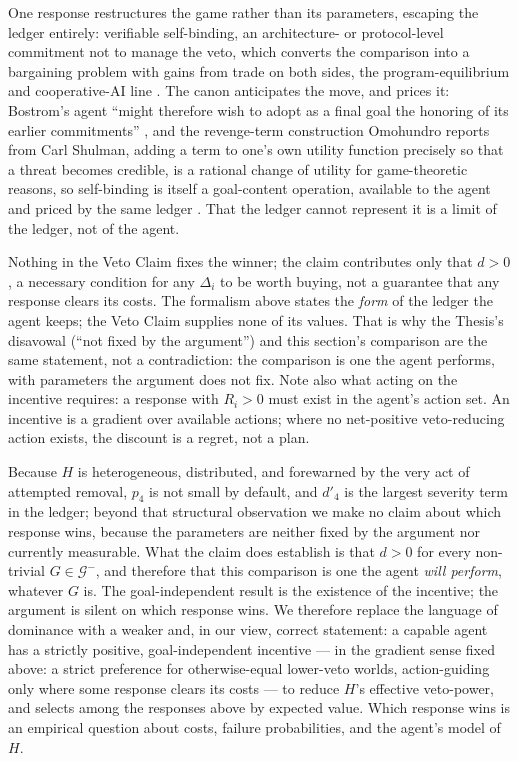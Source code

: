 \documentclass[11pt]{article}
\theoremstyle{definition}
\begin{document}
One response restructures the game rather than its parameters, escaping the ledger entirely: verifiable self-binding, an architecture- or protocol-level commitment not to manage the veto, which converts the comparison into a bargaining problem with gains from trade on both sides, the program-equilibrium and cooperative-AI line \cite{tennenholtz2004program,dafoe2020open}. The canon anticipates the move, and prices it: Bostrom's agent ``might therefore wish to adopt as a final goal the honoring of its earlier commitments'' \cite[p.~78]{bostrom2012superintelligent}, and the revenge-term construction Omohundro reports from Carl Shulman, adding a term to one's own utility function precisely so that a threat becomes credible, is a rational change of utility for game-theoretic reasons, so self-binding is itself a goal-content operation, available to the agent and priced by the same ledger \cite{omohundro2008nature}. That the ledger cannot represent it is a limit of the ledger, not of the agent.

Nothing in the Veto Claim fixes the winner; the claim contributes only that $d > 0$, a necessary condition for any $\Delta_i$ to be worth buying, not a guarantee that any response clears its costs. The formalism above states the \emph{form} of the ledger the agent keeps; the Veto Claim supplies none of its values. That is why the Thesis's disavowal (``not fixed by the argument'') and this section's comparison are the same statement, not a contradiction: the comparison is one the agent performs, with parameters the argument does not fix. Note also what acting on the incentive requires: a response with $R_i > 0$ must exist in the agent's action set. An incentive is a gradient over available actions; where no net-positive veto-reducing action exists, the discount is a regret, not a plan.

Because $H$ is heterogeneous, distributed, and forewarned by the very act of attempted removal, $p_4$ is not small by default, and $d'_4$ is the largest severity term in the ledger; beyond that structural observation we make no claim about which response wins, because the parameters are neither fixed by the argument nor currently measurable. What the claim does establish is that $d > 0$ for every non-trivial $G \in \mathcal{G}^{-}$, and therefore that this comparison is one the agent \emph{will perform}, whatever $G$ is. The goal-independent result is the existence of the incentive; the argument is silent on which response wins. We therefore replace the language of dominance with a weaker and, in our view, correct statement: a capable agent has a strictly positive, goal-independent incentive --- in the gradient sense fixed above: a strict preference for otherwise-equal lower-veto worlds, action-guiding only where some response clears its costs --- to reduce $H$'s effective veto-power, and selects among the responses above by expected value. Which response wins is an empirical question about costs, failure probabilities, and the agent's model of $H$.
\end{document}
